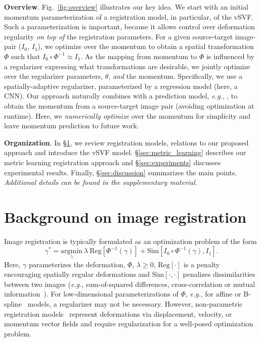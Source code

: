 \documentclass[10pt,twocolumn,letterpaper,table]{article}
\numberwithin{equation}{section}
\theoremstyle{plain}
\theoremstyle{definition}
\def\eg{\emph{e.g.}}  \def\Eg{\emph{E.g.}}
\begin{document}
\noindent
\textbf{Overview}.
Fig.~\ref{fig:overview} illustrates our key idea. We start with an initial momentum parameterization of a registration model, in particular, of the vSVF. Such a parameterization is important, because it allows control over deformation regularity \emph{on top of} the registration parameters. For a given source-target image-pair ($I_0$, $I_1$), we optimize over the momentum to obtain a spatial transformation $\Phi$ such that $I_0\circ\Phi^{-1}\approx I_1$. As the mapping from momentum to $\Phi$ is influenced by a regularizer expressing what transformations are desirable, we jointly optimize over the regularizer parameters, $\theta$, \emph{and} the momentum. Specifically, we use a spatially-adaptive regularizer, parameterized by a regression model (here, a CNN). Our approach naturally combines with a prediction model, \eg, \cite{yang2017quicksilver}, to obtain the momentum from a source-target image pair (avoiding optimization at runtime). Here, we \emph{numerically optimize} over the momentum for simplicity and leave momentum prediction to future work.

\noindent
\textbf{Organization}. In \S\ref{sec:background}, we review registration models, relations to our proposed approach and introduce the vSVF model. \S\ref{sec:metric_learning} describes our metric learning registration approach and \S\ref{sec:experiments} discusses experimental results. 
Finally, \S\ref{sec:discussion} summarizes the main points. \emph{Additional details can be found in the supplementary material.} 

\vspace{-0.25cm}

\section{Background on image registration}
\label{sec:background}

Image registration is typically formulated as an optimization problem of the form
\begin{equation}
  \gamma^* = \underset{\gamma}{\text{argmin}}~\lambda\ \text{Reg}[\Phi^{-1}(\gamma)] + \text{Sim}[I_0\circ\Phi^{-1}(\gamma),I_1].
\label{eqn:basicreg}
\end{equation}
Here, $\gamma$ parameterizes the deformation, $\Phi$, $\lambda\geq 0$, $\text{Reg}[\cdot]$ is a penalty encouraging spatially regular deformations and $\text{Sim}[\cdot,\cdot]$ penalizes dissimilarities between two images (\eg, sum-of-squared differences, cross-correlation or mutual information~\cite{hermosillo2002variational}). For low-dimensional parameterizations of $\Phi$, \eg, for affine or B-spline~\cite{rueckert1999nonrigid,modat2010fast} models, a regularizer may not be necessary. However, non-parametric registration models~\cite{modersitzki2004numerical} represent deformations via displacement, velocity, or momentum vector fields and require regularization for a well-posed optimization problem.
\end{document}
